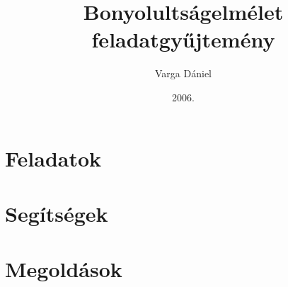 \documentclass[12pt]{book}
\title{Bonyolultságelmélet feladatgyűjtemény}
\author{Varga Dániel}
\date{2006.}
\newcommand{\nothing}{\vspace{0mm}}
\begin{document}

\ifthenelse
{}
{

\newcommand{\pro}[1]{ \stepcounter{problem} \noindent \textbf{\theproblem .} #1 \vspace{2mm} }
\newcommand{\definition}[1]{\hspace*{-8mm} \textbf{Definíció:} #1 \vspace{2mm}}
\newcommand{\sol}[1]{\noindent \textbf{Megoldás:} #1 \vspace{2mm}}
\newcommand{\hint}[1]{\noindent \textbf{Segítség:} #1 \vspace{2mm}}
\newcommand{\prochat}[1]{#1}
\newcommand{\solchat}[1]{#1}


}
{

\maketitle

\tableofcontents

\part{Feladatok}

\newcommand{\pro}[1]{ \stepcounter{problem} \noindent \textbf{\theproblem .} #1 \vspace{4mm} }
\newcommand{\definition}[1]{\hspace*{-8mm} \textbf{Definíció:} #1 \vspace{2mm}}
\newcommand{\sol}[1]{\nothing}
\newcommand{\hint}[1]{\nothing}
\newcommand{\prochat}[1]{#1}
\newcommand{\solchat}[1]{\nothing}



\part{Segítségek}

\setcounter{chapter}{0}

\renewcommand{\pro}[1]{ \stepcounter{problem} }
\renewcommand{\definition}[1]{\nothing}
\renewcommand{\sol}[1]{\nothing}
\renewcommand{\hint}[1]{\noindent \textbf{\theproblem .} #1 \vspace{2mm}}
\renewcommand{\prochat}[1]{\nothing}
\renewcommand{\solchat}[1]{\nothing}



\part{Megoldások}

}
\end{document}
